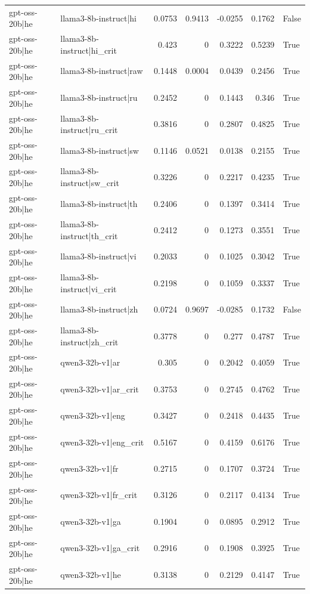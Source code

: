 \begin{table}
\begin{tabular}{l l r r r r l}
gpt-oss-20b|he & llama3-8b-instruct|hi & 0.0753 & 0.9413 & -0.0255 & 0.1762 & False \\
gpt-oss-20b|he & llama3-8b-instruct|hi_crit & 0.423 & 0 & 0.3222 & 0.5239 & True \\
gpt-oss-20b|he & llama3-8b-instruct|raw & 0.1448 & 0.0004 & 0.0439 & 0.2456 & True \\
gpt-oss-20b|he & llama3-8b-instruct|ru & 0.2452 & 0 & 0.1443 & 0.346 & True \\
gpt-oss-20b|he & llama3-8b-instruct|ru_crit & 0.3816 & 0 & 0.2807 & 0.4825 & True \\
gpt-oss-20b|he & llama3-8b-instruct|sw & 0.1146 & 0.0521 & 0.0138 & 0.2155 & True \\
gpt-oss-20b|he & llama3-8b-instruct|sw_crit & 0.3226 & 0 & 0.2217 & 0.4235 & True \\
gpt-oss-20b|he & llama3-8b-instruct|th & 0.2406 & 0 & 0.1397 & 0.3414 & True \\
gpt-oss-20b|he & llama3-8b-instruct|th_crit & 0.2412 & 0 & 0.1273 & 0.3551 & True \\
gpt-oss-20b|he & llama3-8b-instruct|vi & 0.2033 & 0 & 0.1025 & 0.3042 & True \\
gpt-oss-20b|he & llama3-8b-instruct|vi_crit & 0.2198 & 0 & 0.1059 & 0.3337 & True \\
gpt-oss-20b|he & llama3-8b-instruct|zh & 0.0724 & 0.9697 & -0.0285 & 0.1732 & False \\
gpt-oss-20b|he & llama3-8b-instruct|zh_crit & 0.3778 & 0 & 0.277 & 0.4787 & True \\
gpt-oss-20b|he & qwen3-32b-v1|ar & 0.305 & 0 & 0.2042 & 0.4059 & True \\
gpt-oss-20b|he & qwen3-32b-v1|ar_crit & 0.3753 & 0 & 0.2745 & 0.4762 & True \\
gpt-oss-20b|he & qwen3-32b-v1|eng & 0.3427 & 0 & 0.2418 & 0.4435 & True \\
gpt-oss-20b|he & qwen3-32b-v1|eng_crit & 0.5167 & 0 & 0.4159 & 0.6176 & True \\
gpt-oss-20b|he & qwen3-32b-v1|fr & 0.2715 & 0 & 0.1707 & 0.3724 & True \\
gpt-oss-20b|he & qwen3-32b-v1|fr_crit & 0.3126 & 0 & 0.2117 & 0.4134 & True \\
gpt-oss-20b|he & qwen3-32b-v1|ga & 0.1904 & 0 & 0.0895 & 0.2912 & True \\
gpt-oss-20b|he & qwen3-32b-v1|ga_crit & 0.2916 & 0 & 0.1908 & 0.3925 & True \\
gpt-oss-20b|he & qwen3-32b-v1|he & 0.3138 & 0 & 0.2129 & 0.4147 & True \\

\end{tabular}
\end{table}
